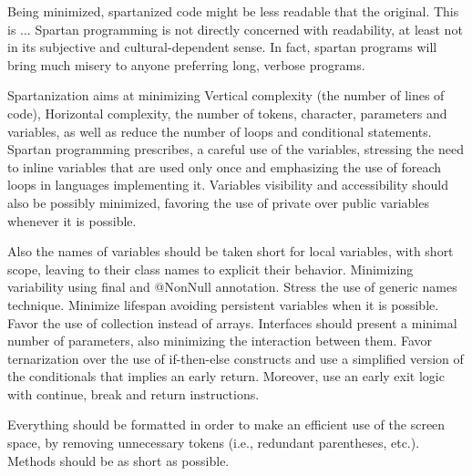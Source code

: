 Being minimized, spartanized code might be less readable that the original.
This is ... Spartan programming is not directly concerned with readability, at
least not in its subjective and cultural-dependent sense. In fact, spartan
programs will bring much misery to anyone preferring long, verbose programs.

Spartanization aims at minimizing Vertical complexity (the number of lines of code),
Horizontal complexity, the number of tokens, character, parameters and variables,
as well as reduce the number of loops and conditional statements.
Spartan programming prescribes, a careful use of the variables, stressing the need
to inline variables that are used only once and emphasizing the use of foreach loops
in languages implementing it. Variables visibility and accessibility should also be
possibly minimized, favoring the use of private over public variables whenever it
is possible.

Also the names of variables should be taken short for local variables, with short scope,
leaving to their class names to explicit their behavior. Minimizing variability using
final and @NonNull annotation. Stress the use of generic names technique. Minimize lifespan
avoiding persistent variables when it is possible. Favor the use of collection instead
of arrays. Interfaces should present a minimal number of parameters, also minimizing
the interaction between them. Favor ternarization over the use of if-then-else constructs
and use a simplified version of the conditionals that implies an early return. Moreover,
use an early exit logic with continue, break and return instructions.

Everything should be formatted in order to make an efficient use of the screen space,
by removing unnecessary tokens (i.e., redundant parentheses, etc.).
Methods should be as short as possible.
